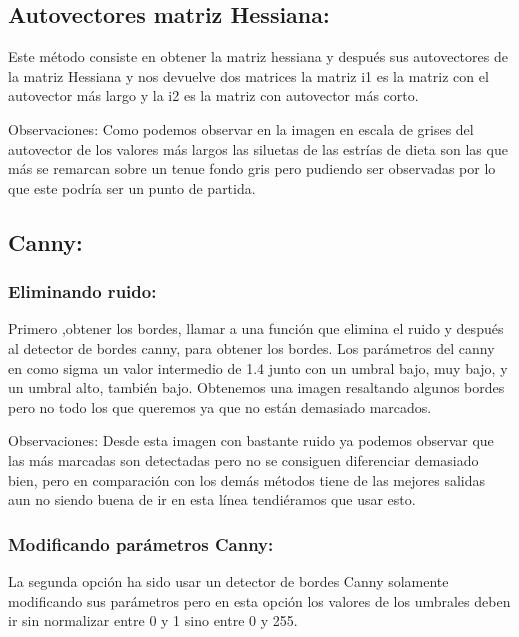 \subsection{Autovectores matriz Hessiana:}
Este método consiste en obtener la matriz hessiana y después sus autovectores de la matriz Hessiana y nos devuelve dos matrices la matriz i1 es la matriz con el autovector más largo y la i2 es la matriz con autovector más corto.





Observaciones: 
Como podemos observar en la imagen en escala de grises del autovector de los valores más largos las siluetas de las estrías de dieta son las que más se remarcan sobre un tenue fondo gris pero pudiendo ser observadas por lo que este podría ser un punto de partida.



\subsection{Canny:}

\subsubsection{Eliminando ruido:}
Primero ,obtener los bordes, llamar a una función que elimina el ruido y después al detector de bordes canny, para obtener los bordes.
Los parámetros del canny en como sigma un valor intermedio de 1.4 junto con un umbral bajo, muy bajo, y un umbral alto, también bajo.
Obtenemos una imagen resaltando algunos bordes pero no todo los que queremos ya que no están demasiado marcados.




Observaciones:
Desde esta imagen con bastante ruido ya podemos observar que las más marcadas son detectadas pero no se consiguen diferenciar demasiado bien, pero en comparación con los demás métodos tiene de las mejores salidas aun no siendo buena de ir en esta línea tendiéramos que usar esto.

\subsubsection{Modificando parámetros Canny:}

La segunda opción ha sido usar un detector de bordes Canny solamente modificando sus parámetros pero en esta opción los valores de los umbrales deben ir sin normalizar entre 0 y 1 sino entre 0 y 255.


